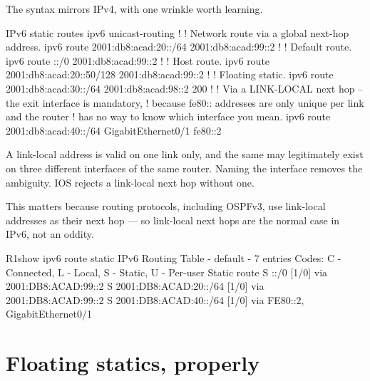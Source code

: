 The syntax mirrors IPv4, with one wrinkle worth learning.

\begin{config}{IPv6 static routes}
ipv6 unicast-routing
!
! Network route via a global next-hop address.
ipv6 route 2001:db8:acad:20::/64 2001:db8:acad:99::2
!
! Default route.
ipv6 route ::/0 2001:db8:acad:99::2
!
! Host route.
ipv6 route 2001:db8:acad:20::50/128 2001:db8:acad:99::2
!
! Floating static.
ipv6 route 2001:db8:acad:30::/64 2001:db8:acad:98::2 200
!
! Via a LINK-LOCAL next hop -- the exit interface is mandatory,
! because fe80:: addresses are only unique per link and the router
! has no way to know which interface you mean.
ipv6 route 2001:db8:acad:40::/64 GigabitEthernet0/1 fe80::2
\end{config}

\begin{conceptbox}
A link-local address is valid on one link only, and the same  may
legitimately exist on three different interfaces of the same router. Naming the
interface removes the ambiguity. IOS rejects a link-local next hop without one.

This matters because routing protocols, including OSPFv3, use link-local
addresses as their next hop --- so link-local next hops are the normal case in
IPv6, not an oddity.
\end{conceptbox}

\begin{verify}{R1}{show ipv6 route static}
IPv6 Routing Table - default - 7 entries
Codes: C - Connected, L - Local, S - Static, U - Per-user Static route
S   ::/0 [1/0]
     via 2001:DB8:ACAD:99::2
S   2001:DB8:ACAD:20::/64 [1/0]
     via 2001:DB8:ACAD:99::2
S   2001:DB8:ACAD:40::/64 [1/0]
     via FE80::2, GigabitEthernet0/1
\end{verify}

\section{Floating statics, properly}

